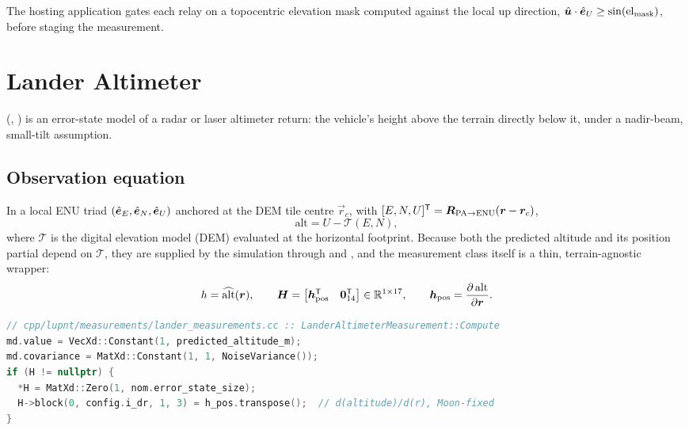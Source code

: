 The hosting application gates each relay on a topocentric elevation mask
computed against the local up direction,
$\hat{\bm{u}}\cdot\hat{\bm{e}}_U \ge \sin(\mathrm{el}_\mathrm{mask})$, before staging
the measurement.

\section{Lander Altimeter}
\label{sec:meas-altimeter}

(,
) is an error-state model
of a radar or laser altimeter return: the vehicle's height above the terrain
directly below it, under a nadir-beam, small-tilt assumption.

\subsection{Observation equation}

In a local ENU triad $(\hat{\bm{e}}_E, \hat{\bm{e}}_N, \hat{\bm{e}}_U)$ anchored at the DEM
tile centre $\vec{r}_c$, with
$[E, N, U]^{\mathsf{T}} = \bm{R}_{\mathrm{PA}\to\mathrm{ENU}}(\bm{r} - \bm{r}_c)$,
\begin{equation}
  \mathrm{alt} = U - \mathcal{T}(E, N),
  \label{eq:meas-alt-h}
\end{equation}
where $\mathcal{T}$ is the digital elevation model (DEM) evaluated at the
horizontal footprint. Because both the predicted altitude and its position
partial depend on $\mathcal{T}$, they are supplied by the simulation through
 and , and the measurement class
itself is a thin, terrain-agnostic wrapper:
\begin{equation}
  h = \widehat{\mathrm{alt}}(\bm{r}),
  \qquad
  \bm{H} =
  \begin{bmatrix}
    \bm{h}_\mathrm{pos}^{\mathsf{T}} & \bm{0}^{\mathsf{T}}_{14}
  \end{bmatrix}
  \in \mathbb{R}^{1\times 17},
  \qquad
  \bm{h}_\mathrm{pos} = \frac{\partial\,\mathrm{alt}}{\partial \bm{r}} .
  \label{eq:meas-alt-jac}
\end{equation}

\begin{lstlisting}[language=cpp, caption={The altimeter model is a thin wrapper
  around the DEM-supplied prediction and slope.}, label={lst:meas-alt}]
// cpp/lupnt/measurements/lander_measurements.cc :: LanderAltimeterMeasurement::Compute
md.value = VecXd::Constant(1, predicted_altitude_m);
md.covariance = MatXd::Constant(1, 1, NoiseVariance());
if (H != nullptr) {
  *H = MatXd::Zero(1, nom.error_state_size);
  H->block(0, config.i_dr, 1, 3) = h_pos.transpose();  // d(altitude)/d(r), Moon-fixed
}
\end{lstlisting}

